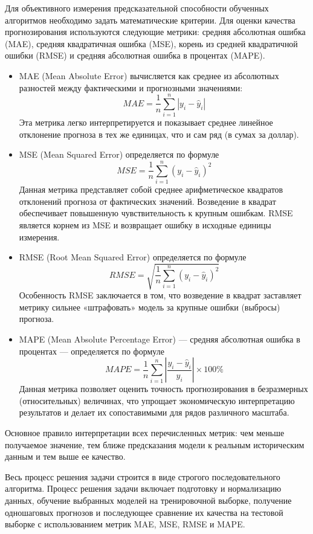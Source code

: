 Для объективного измерения предсказательной способности обученных алгоритмов необходимо задать математические критерии. Для оценки качества прогнозирования используются следующие метрики: средняя абсолютная ошибка (MAE), средняя квадратичная ошибка (MSE), корень из средней квадратичной ошибки (RMSE) и средняя абсолютная ошибка в процентах (MAPE).
\begin{itemize}
    \item MAE (Mean Absolute Error) вычисляется как среднее из абсолютных разностей между фактическими и прогнозными значениями: $$MAE = \frac{1}{n} \sum_{i=1}^{n} |y_i - \hat{y}_i|$$ Эта метрика легко интерпретируется и показывает среднее линейное отклонение прогноза в тех же единицах, что и сам ряд (в сумах за доллар).
    \item MSE (Mean Squared Error) определяется по формуле $$MSE = \frac{1}{n} \sum_{i=1}^{n} (y_i - \hat{y}_i)^2$$ Данная метрика представляет собой среднее арифметическое квадратов отклонений прогноза от фактических значений. Возведение в квадрат обеспечивает повышенную чувствительность к крупным ошибкам. RMSE является корнем из MSE и возвращает ошибку в исходные единицы измерения.
    \item RMSE (Root Mean Squared Error) определяется по формуле $$RMSE = \sqrt{\frac{1}{n} \sum_{i=1}^{n} (y_i - \hat{y}_i)^2}$$ Особенность RMSE заключается в том, что возведение в квадрат заставляет метрику сильнее «штрафовать» модель за крупные ошибки (выбросы) прогноза.
    \item MAPE (Mean Absolute Percentage Error) — средняя абсолютная ошибка в процентах — определяется по формуле $$MAPE = \frac{1}{n} \sum_{i=1}^{n} \left|\frac{y_i - \hat{y}_i}{y_i}\right| \times 100\%$$ Данная метрика позволяет оценить точность прогнозирования в безразмерных (относительных) величинах, что упрощает экономическую интерпретацию результатов и делает их сопоставимыми для рядов различного масштаба.
\end{itemize}

Основное правило интерпретации всех перечисленных метрик: чем меньше получаемое значение, тем ближе предсказания модели к реальным историческим данным и тем выше ее качество.

Весь процесс решения задачи строится в виде строгого последовательного алгоритма. Процесс решения задачи включает подготовку и нормализацию данных, обучение выбранных моделей на тренировочной выборке, получение одношаговых прогнозов и последующее сравнение их качества на тестовой выборке с использованием метрик MAE, MSE, RMSE и MAPE.

